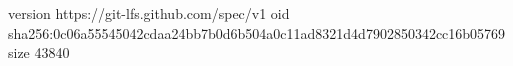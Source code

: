 version https://git-lfs.github.com/spec/v1
oid sha256:0c06a55545042cdaa24bb7b0d6b504a0c11ad8321d4d7902850342cc16b05769
size 43840
